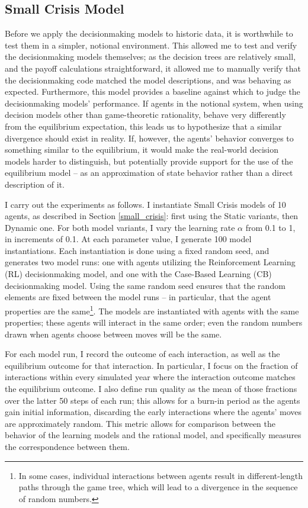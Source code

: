 \subsection{Small Crisis Model} \label{small_crisis_results}
 
Before we apply the decisionmaking models to historic data, it is worthwhile to test them in a simpler, notional environment. This allowed me to test and verify the decisionmaking models themselves; as the decision trees are relatively small, and the payoff calculations straightforward, it allowed me to manually verify that the decisionmaking code matched the model descriptions, and was behaving as expected. Furthermore, this model provides a baseline against which to judge the decisionmaking models' performance. If agents in the notional system, when using decision models other than game-theoretic rationality, behave very differently from the equilibrium expectation, this leads us to hypothesize that a similar divergence should exist in reality. If, however, the agents' behavior converges to something similar to the equilibrium, it would make the real-world decision models harder to distinguish, but potentially provide support for the use of the equilibrium model -- as an approximation of state behavior rather than a direct description of it.

I carry out the experiments as follows. I instantiate Small Crisis models of 10 agents, as described in Section \ref{small_crisis}: first using the Static variants, then Dynamic one. For both model variants, I vary the learning rate $\alpha$ from 0.1 to 1, in increments of 0.1. At each parameter value, I generate 100 model instantiations. Each instantiation is done using a fixed random seed, and generates two model runs: one with agents utilizing the Reinforcement Learning (RL) decisionmaking model, and one with the Case-Based Learning (CB) decisionmaking model. Using the same random seed ensures that the random elements are fixed between the model runs -- in particular, that the agent properties are the same\footnote{In some cases, individual interactions between agents result in different-length paths through the game tree, which will lead to a divergence in the sequence of random numbers.}. The models are instantiated with agents with the same properties; these agents will interact in the same order; even the random numbers drawn when agents choose between moves will be the same. 

For each model run, I record the outcome of each interaction, as well as the equilibrium outcome for that interaction. In particular, I focus on the fraction of interactions within every simulated year where the interaction outcome matches the equilibrium outcome. I also define run quality as the mean of those fractions over the latter 50 steps of each run; this allows for a burn-in period as the agents gain initial information, discarding the early interactions where the agents' moves are approximately random. This metric allows for comparison between the behavior of the learning models and the rational model, and specifically measures the correspondence between them.

